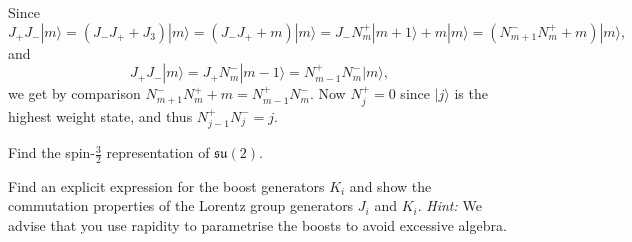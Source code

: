 \documentclass[notes.tex]{subfiles}
\begin{document}
\begin{Answer} 
Since 
\[ J_+J_-|m\rangle=(J_- J_++J_3) |m\rangle=(J_- J_++m) |m\rangle=J_- N_m^+|m+1\rangle+m |m\rangle=(N_{m+1}^-N_m^++m) |m\rangle, \]
and
\[ J_+J_-|m\rangle=J_+N_m^-|m-1\rangle= N_{m-1}^+N_m^-|m\rangle, \]
we get by comparison $N_{m+1}^-N_m^++m=N_{m-1}^+N_m^-$. Now $N_j^+=0$ since $|j\rangle$ is the highest weight state, and thus $N_{j-1}^+N_j^-=j$.
\end{Answer}


\begin{Exercise}[]
Find the spin-$\frac{3}{2}$ representation of $\mathfrak{su}(2)$.
\end{Exercise}


\begin{Exercise}[label=ex:boost_generators]
Find an explicit expression for the boost generators $K_i$ and show the commutation properties of the Lorentz group generators $J_i$ and $K_i$. {\it Hint:} We advise that you use rapidity to parametrise the boosts to avoid excessive algebra.
\end{Exercise}
\end{document}
